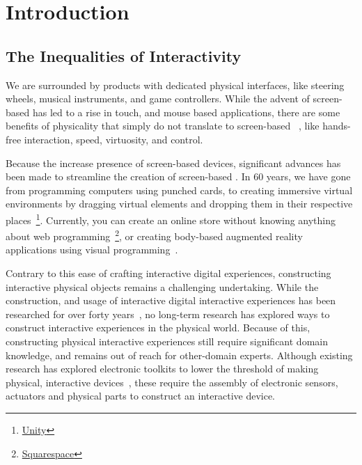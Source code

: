 \chapter{Introduction}
  \section{The Inequalities of Interactivity}
    We are surrounded by products with dedicated physical interfaces, like
    steering wheels, musical instruments, and game controllers. While the advent
    of screen-based  has led to a rise in touch, and mouse based
    applications, there are some benefits of physicality that simply do not
    translate to screen-based ~\cite{klemmer:2006}, like
    hands-free interaction, speed, virtuosity, and control. 

    Because the increase presence of screen-based devices, significant advances
    has been made to streamline the creation of screen-based .  In 60 years, we have gone from programming computers using
    punched cards, to creating immersive virtual environments by dragging
    virtual elements and dropping them in their respective
    places~\footnote{\href{https://unity.com}{Unity}}.  Currently, you can
    create an online store without knowing anything about web
    programming~\footnote{\href{https://www.squarespace.com}{Squarespace}}, or
    creating body-based augmented reality applications using visual
    programming~\cite{Pohl:2020}.

    Contrary to this ease of crafting interactive digital experiences,
    constructing interactive physical objects remains a challenging
    undertaking. While the construction, and usage of interactive digital
    interactive experiences has been researched for over forty
    years~\cite{CHI, UIST}, no long-term research has explored ways to
    construct interactive experiences in the physical world. Because of this,
    constructing physical interactive experiences still require significant
    domain knowledge, and remains out of reach for other-domain experts. Although
    existing research has explored electronic toolkits to lower the threshold of
    making physical, interactive devices~\cite{Greenberg:2001, arduino}, these
    require the assembly of electronic sensors, actuators and physical parts to
    construct an interactive device.

